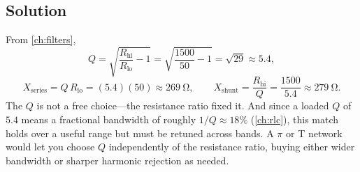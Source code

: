 \subsection*{Solution}
From \cref{ch:filters},
\[
Q=\sqrt{\frac{R_{\text{hi}}}{R_{\text{lo}}}-1}=\sqrt{\frac{1500}{50}-1}=\sqrt{29}\approx5.4,
\]
\[
X_{\text{series}}=Q\,R_{\text{lo}}=(5.4)(50)\approx\SI{269}{\ohm},
\qquad
X_{\text{shunt}}=\frac{R_{\text{hi}}}{Q}=\frac{1500}{5.4}\approx\SI{279}{\ohm}.
\]
The \(Q\) is not a free choice---the resistance ratio fixed it. And since a loaded
\(Q\) of \(5.4\) means a fractional bandwidth of roughly \(1/Q\approx18\%\)
(\cref{ch:rlc}), this match holds over a useful range but must be retuned across
bands. A \(\pi\) or T network would let you choose \(Q\) independently of the
resistance ratio, buying either wider bandwidth or sharper harmonic rejection as
needed.

